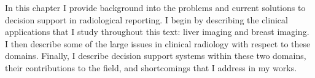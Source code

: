 In this chapter I provide background into the problems and current solutions to decision support in radiological reporting. I begin by describing the clinical applications that I study throughout this text: liver imaging and breast imaging. I then describe some of the large issues in clinical radiology with respect to these domains. Finally, I describe decision support systems within these two domains, their contributions to the field, and shortcomings that I address in my works.
